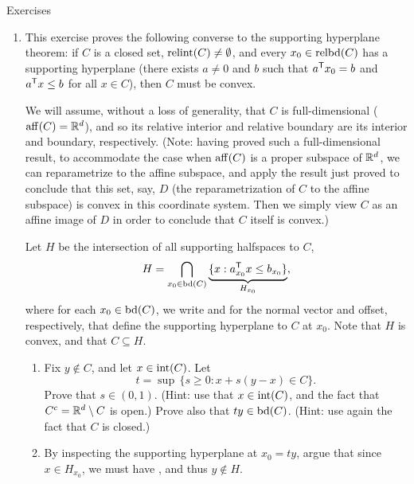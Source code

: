 \begin{xcb}{Exercises}
\begin{enumerate}[label=\thechapter.\arabic*]
\settowidth{\leftmargini}{0.00.\hskip\labelsep}
\item \label{ex:converse_supporting_hyperplane}
  This exercise proves the following converse to the supporting hyperplane
  theorem: if $C$ is a closed set, $\operatorname{relint}(C) \not= \emptyset$, and every $x_0
  \in \operatorname{relbd}(C)$ has a supporting hyperplane (there exists $a\not=0$ and $b$  
  such that $a^{\mathsf{T}} x_0 = b$ and $a^{\mathsf{T}} x \leq b$ for all $x \in C$), then $C$     
  must be convex.   

  We will assume, without a loss of generality, that $C$ is full-dimensional
  ($\operatorname{aff}(C) = \mathbb{R}^d$), and so its relative interior and relative boundary are its
  interior and boundary, respectively. (Note: having proved such a
  full-dimensional result, to accommodate the case when $\operatorname{aff}(C)$ is a proper
  subspace of $\mathbb{R}^d$, we can reparametrize to the affine subspace, and apply the
  result just proved to conclude that this set, say, $D$ (the reparametrization 
  of $C$ to the affine subspace) is convex in this coordinate system. Then we 
  simply view $C$ as an affine image of $D$ in order to conclude that $C$ itself
  is convex.)  

  Let $H$ be the intersection of all supporting halfspaces to $C$, 
  \[
  H = \bigcap_{x_0 \in \operatorname{bd}(C)} \underbrace{\{ x :  a_{x_0}^{\mathsf{T}} x \leq
    b_{x_0} \}}_{H_{x_0}}, 
  \]
  where for each $x_0 \in \operatorname{bd}(C)$, we write  and
   for the normal vector and offset, respectively, that define
  the supporting hyperplane to $C$ at $x_0$. Note that $H$ is convex, and that
  $C \subseteq H$.    

\begin{enumerate}[label=\alph*.]
\item Fix $y \notin C$, and let $x \in \operatorname{int}(C)$. Let
  \[
  t = \sup \, \{ s \geq 0 : x + s (y - x) \in C \}. 
  \]
  Prove that $s \in (0,1)$. (Hint: use that $x \in \operatorname{int}(C)$, and the fact
  that $C^c = \mathbb{R}^d \setminus C$ is open.) Prove also that $t y \in
  \operatorname{bd}(C)$. (Hint: use again the fact that $C$ is closed.) 

\item By inspecting the supporting hyperplane at $x_0 = t y$, argue that since
  $x \in H_{x_0}$, we must have , and thus $y \notin 
  H$. 


\end{enumerate}
\end{enumerate}
\end{xcb}
